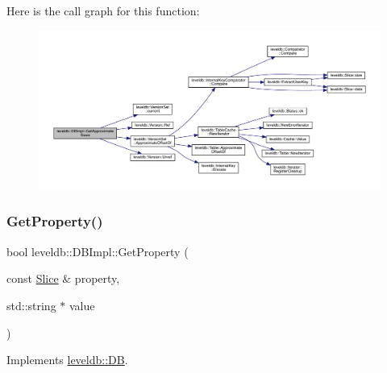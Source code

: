 Here is the call graph for this function\+:
\nopagebreak
\begin{figure}[H]
\begin{center}
\leavevmode
\includegraphics[width=350pt]{classleveldb_1_1_d_b_impl_af08e218d92064699942c195ce0f06010_cgraph}
\end{center}
\end{figure}
\mbox{\label{classleveldb_1_1_d_b_impl_ad1a2023ce171c8f8476664f5b1cbab4d}} 
\subsubsection{\texorpdfstring{GetProperty()}{GetProperty()}}
{\footnotesize\ttfamily bool leveldb\+::\+D\+B\+Impl\+::\+Get\+Property (\begin{DoxyParamCaption}\item[{const \mbox{\hyperlink{classleveldb_1_1_slice}{Slice}} \&}]{property,  }\item[{std\+::string $\ast$}]{value }\end{DoxyParamCaption})\hspace{0.3cm}{\ttfamily [virtual]}}



Implements \mbox{\hyperlink{classleveldb_1_1_d_b_afcd557d80bac6668f20372c9e737d807}{leveldb\+::\+DB}}.

